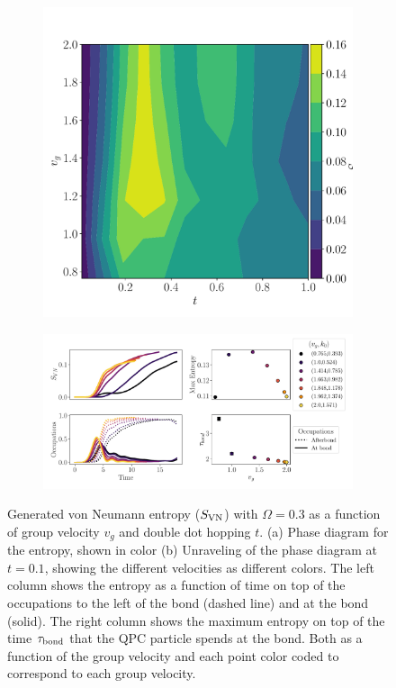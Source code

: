 \documentclass{article}
\begin{document}
\begin{figure}[h]
    \centering
    \begin{subfigure}[b]{0.4\textwidth}
        \includegraphics[width=\textwidth]{figures/report_04_2025/entropy_phase_diagram.pdf}
        \caption{}
    \end{subfigure}
    \vspace{0.001\textwidth}
    \begin{subfigure}[b]{0.85\textwidth}
        \includegraphics[width=\textwidth]{figures/report_04_2025/entropy_summary.pdf}
        \caption{}
    \end{subfigure}
    \caption{Generated von Neumann entropy ($S_{\rm V N}$) with $\Omega = 0.3$ as a function
            of group velocity $v_g$ and double dot hopping $t$. (a) Phase diagram for the entropy,
            shown in color (b) Unraveling of the phase diagram at $t=0.1$, showing the different
            velocities as different colors. The left column shows the entropy as a function of 
            time on top of the occupations to the left of the bond (dashed line) and at the 
            bond (solid). The right column shows the maximum entropy on 
            top of the time $\tau_{\rm bond}$ that the QPC particle spends at the bond. Both as a function
            of the group velocity and each point color coded to correspond to each group velocity.}
    \label{fig:entropy_phase_diagram}
\end{figure}
\end{document}
